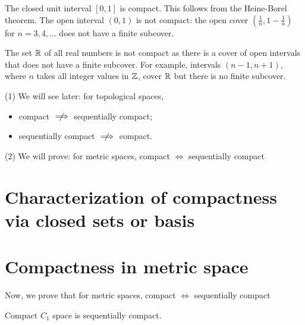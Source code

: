 \begin{example}{}{}
    The closed unit interval $[0, 1]$ is compact. 
    This follows from the Heine-Borel theorem.
    The open interval $(0, 1)$ is not compact: 
    the open cover $(\frac{1}{n},1-\frac{1}{n})$ for $n=3,4,...$ does not have a finite subcover. 
\end{example}

\begin{example}{}{}
    The set $\mathbb{R}$ of all real numbers is not compact 
    as there is a cover of open intervals that 
    does not have a finite subcover. 
    For example, intervals $(n-1,n+1)$, where $n$ takes all integer values in $\mathbb{Z}$, cover $\mathbb{R}$ but there is no finite subcover.
\end{example}


\begin{remark}
    (1) We will see later: for topological spaces,
    \begin{itemize}
        \item compact $\centernot\implies$ sequentially compact;
        \item sequentially compact $\centernot\implies$ compact.
    \end{itemize}
    \hspace{1cm} (2) We will prove: for metric spaces, compact $\Leftrightarrow$ sequentially compact 
\end{remark}


\section{Characterization of compactness via closed sets or basis}

\section{Compactness in metric space}
Now, we prove that for metric spaces, compact $\Leftrightarrow$ sequentially compact 

\begin{proposition}{}{}
    Compact $C_1$ space is sequentially compact.  
\end{proposition}

